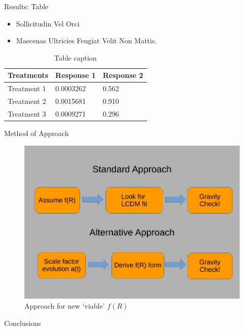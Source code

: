 \documentclass[final,hyperref={pdfpagelabels=false}]{beamer}
\begin{document}
\begin{frame}[t]
\begin{columns}[t]
\begin{column}{.465\textwidth}
\begin{block}{Results: Table}
\begin{itemize}
\item Sollicitudin Vel Orci
\item Maecenas Ultricies Feugiat Velit Non Mattis.
\end{itemize}

\begin{table}
\begin{tabular}{l l l}
\toprule
\textbf{Treatments} & \textbf{Response 1} & \textbf{Response 2}\\
\midrule
Treatment 1 & 0.0003262 & 0.562 \\
Treatment 2 & 0.0015681 & 0.910 \\
Treatment 3 & 0.0009271 & 0.296 \\
\bottomrule
\end{tabular}
\caption{Table caption}
\end{table}
     
\end{block}


\begin{block}{Method of Approach}

\begin{figure}
\includegraphics[width=0.8\linewidth]{IAGRG_poster_fR}
\caption{Approach for new `viable' $f(R)$}
\end{figure}

\end{block}


\begin{block}{Conclusions}


\end{block}
\end{column}
\end{columns}
\end{frame}
\end{document}
